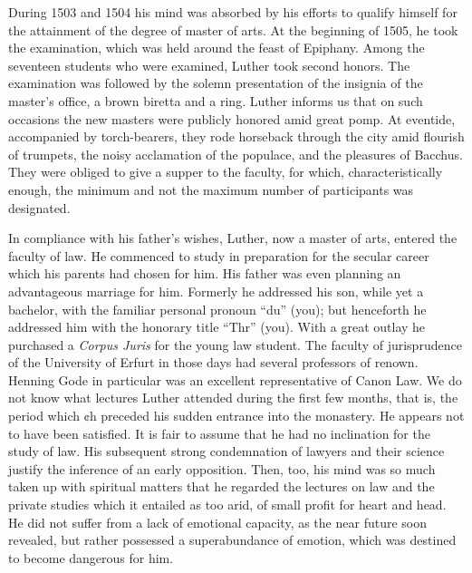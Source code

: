 During 1503 and 1504 his mind was absorbed by his efforts to
qualify himself for the attainment of the degree of master of arts.
At the beginning of 1505, he took the examination, which was
held around the feast of Epiphany. Among the seventeen students
who were examined, Luther took second honors. The examination
was followed by the solemn presentation of the insignia of the
master’s office, a brown biretta and a ring. Luther informs us that
on such occasions the new masters were publicly honored amid great
pomp. At eventide, accompanied by torch-bearers, they rode horseback through the city amid flourish of trumpets, the noisy acclamation of the populace, and the pleasures of Bacchus. They were
obliged to give a supper to the faculty, for which, characteristically
enough, the minimum and not the maximum number of participants
was designated.

In compliance with his father’s wishes, Luther, now a master of
arts, entered the faculty of law. He commenced to study in preparation
for the secular career which his parents had chosen for him.
His father was even planning an advantageous marriage for him.
Formerly he addressed his son, while yet a bachelor, with the familiar
personal pronoun “du” (you); but henceforth he addressed him with
the honorary title “Thr” (you). With a great outlay he purchased
a \textit{Corpus Juris} for the young law student.
The faculty of jurisprudence of the University of Erfurt in
those days had several professors of renown. Henning Gode in
particular was an excellent representative of Canon Law. We do
not know what lectures Luther attended during the first few
months, that is, the period which ¢h preceded his sudden entrance into
the monastery. He appears not to have been satisfied. It is fair to
assume that he had no inclination for the study of law. His subsequent
strong condemnation of lawyers and their science justify the
inference of an early opposition. Then, too, his mind was so much
taken up with spiritual matters that he regarded the lectures on
law and the private studies which it entailed as too arid, of small
profit for heart and head. He did not suffer from a lack of emotional
capacity, as the near future soon revealed, but rather possessed a
superabundance of emotion, which was destined to become dangerous
for him.

